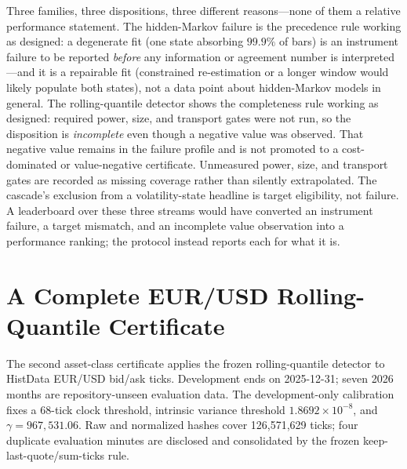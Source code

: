 \documentclass[3p]{elsarticle}
\begin{document}
Three families, three dispositions, three different reasons---none of them a
relative performance statement. The hidden-Markov failure is the precedence
rule working as designed: a degenerate fit (one state absorbing $99.9\%$ of
bars) is an instrument failure to be reported \emph{before} any information
or agreement number is interpreted---and it is a repairable fit (constrained
re-estimation or a longer window would likely populate both states), not a
data point about hidden-Markov models in general. The rolling-quantile
detector shows the completeness rule working as designed: required power,
size, and transport gates were not run, so the disposition is
\emph{incomplete} even though a negative value was observed. That negative
value remains in the failure profile and is not promoted to a
cost-dominated or value-negative certificate. Unmeasured power, size, and
transport gates are recorded as missing coverage rather than silently
extrapolated. The cascade's exclusion from a volatility-state headline is
target eligibility, not failure. A leaderboard over these three streams would
have converted an instrument failure, a target mismatch, and an incomplete
value observation into a performance ranking; the protocol instead reports
each for what it is.

\section{A Complete EUR/USD Rolling-Quantile Certificate}
\label{sec:eurusd-certificate}

The second asset-class certificate applies the frozen rolling-quantile
detector to HistData EUR/USD bid/ask ticks. Development ends on
2025-12-31; seven 2026 months are repository-unseen evaluation data. The
development-only calibration fixes a 68-tick clock threshold, intrinsic
variance threshold $1.8692\times10^{-8}$, and
$\gamma=967{,}531.06$. Raw and normalized hashes cover 126,571,629 ticks;
four duplicate evaluation minutes are disclosed and consolidated by the
frozen keep-last-quote/sum-ticks rule.
\end{document}
